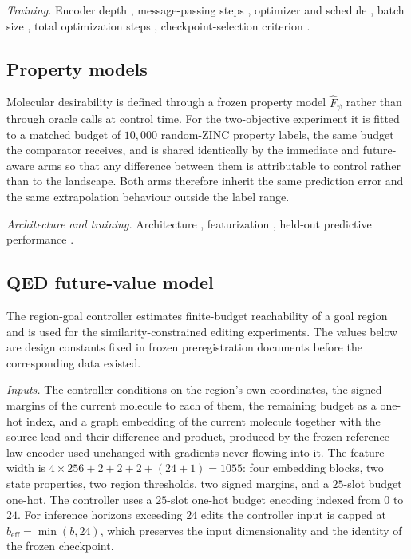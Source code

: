 \emph{Training.} Encoder depth \XXX{}, message-passing steps \XXX{}, optimizer and schedule \XXX{}, batch size \XXX{}, total optimization steps \XXX{}, checkpoint-selection criterion \XXX{}.

\subsection{Property models}

Molecular desirability is defined through a frozen property model $\widehat F_\psi$ rather than through oracle calls at control time. For the two-objective experiment it is fitted to a matched budget of $10{,}000$ random-ZINC property labels, the same budget the comparator receives, and is shared identically by the immediate and future-aware arms so that any difference between them is attributable to control rather than to the landscape. Both arms therefore inherit the same prediction error and the same extrapolation behaviour outside the label range.

\emph{Architecture and training.} Architecture \XXX{}, featurization \XXX{}, held-out predictive performance \XXX{}.

\subsection{{QED} future-value model}
\label{app:controller}

The region-goal controller estimates finite-budget reachability of a goal region and is used for the similarity-constrained editing experiments. The values below are design constants fixed in frozen preregistration documents before the corresponding data existed.

\emph{Inputs.} The controller conditions on the region's own coordinates, the signed margins of the current molecule to each of them, the remaining budget as a one-hot index, and a graph embedding of the current molecule together with the source lead and their difference and product, produced by the frozen reference-law encoder used unchanged with gradients never flowing into it. The feature width is $4\times256+2+2+2+(24+1)=1055$: four embedding blocks, two state properties, two region thresholds, two signed margins, and a $25$-slot budget one-hot. The controller uses a $25$-slot one-hot budget encoding indexed from $0$ to $24$. For inference horizons exceeding $24$ edits the controller input is capped at $b_{\mathrm{eff}}=\min(b,24)$, which preserves the input dimensionality and the identity of the frozen checkpoint.

